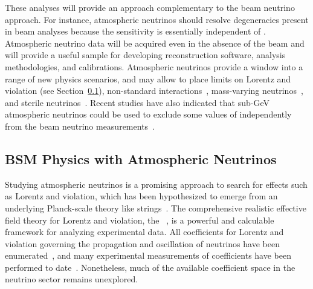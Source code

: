 These analyses will provide an approach complementary to the beam neutrino approach. For instance, atmospheric neutrinos should resolve  degeneracies present in beam analyses because the  sensitivity is essentially independent of \deltacp. Atmospheric neutrino data will be acquired 
even in the absence of the beam and will provide a useful sample for developing reconstruction software, analysis methodologies, and calibrations.  Atmospheric neutrinos provide a window into a range of new physics scenarios, and may allow  to place limits on Lorentz and  violation (see Section~\ref{sec:nonaccel-atm-bsm}), 
non-standard interactions~\cite{Chatterjee:2014gxa}, mass-varying neutrinos~\cite{Abe:2008zza}, and
sterile neutrinos~\cite{Abe:2014gda}.
Recent studies have also indicated that sub-GeV atmospheric neutrinos could be used to exclude some values of \deltacp independently from the beam neutrino measurements~\cite{Kelly:2019itm}.

\subsection{BSM Physics with Atmospheric Neutrinos}
\label{sec:nonaccel-atm-bsm}

Studying  atmospheric neutrinos is a promising approach
to search for  effects such as Lorentz and  violation,
which has been hypothesized
to emerge from an underlying Planck-scale theory like strings~\cite{Kostelecky:1988zi,Kostelecky:1991ak}.
The comprehensive realistic effective field theory
for Lorentz and  violation,
the ~\cite{Kostelecky:1994rn,Colladay:1996iz,Colladay:1998fq,Kostelecky:2003fs},
is a powerful and calculable framework
for analyzing experimental data.
All  coefficients for Lorentz and  violation
governing the propagation and oscillation of neutrinos
have been enumerated~\cite{Kostelecky:2003cr,Kostelecky:2011gq},
and many experimental measurements of  coefficients 
have been performed to date~\cite{Kostelecky:2008ts}.
Nonetheless,
much of the available  coefficient space 
in the neutrino sector remains unexplored.

